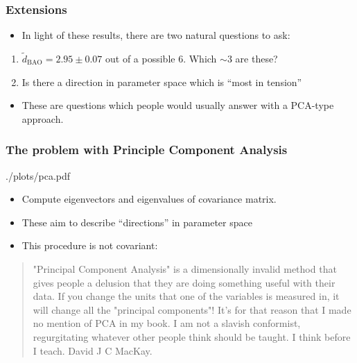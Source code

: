 \documentclass[%
]{beamer}
\begin{document}
\begin{frame}
    \frametitle{Extensions}
    \begin{itemize}
        \item In light of these results, there are two natural questions to ask:
    \end{itemize}
    \begin{enumerate}
        \item $\tilde{d}_\text{BAO} = 2.95 \pm  0.07 $ out of a possible 6. Which $\sim 3$ are these?
        \item Is there a direction in parameter space which is ``most in tension''
    \end{enumerate}
    \begin{itemize}
        \item These are questions which people would usually answer with a PCA-type approach.
    \end{itemize}
\end{frame}

\begin{frame}
    \frametitle{The problem with Principle Component Analysis}

    \begin{figright}[0.6]{./plots/pca.pdf}
        \begin{itemize}
            \item Compute eigenvectors and eigenvalues of covariance matrix.
            \item These aim to describe ``directions'' in parameter space
            \item This procedure is not covariant:
        \end{itemize}
    \end{figright}
    \begin{quote}
        "Principal Component Analysis" is a dimensionally invalid method that gives people a delusion that they are doing something useful with their data. If you change the units that one of the variables is measured in, it will change all the "principal components"! It's for that reason that I made no mention of PCA in my book. I am not a slavish conformist, regurgitating whatever other people think should be taught. I think before I teach. David J C MacKay.

        \end{quote}
\end{frame}
\end{document}
